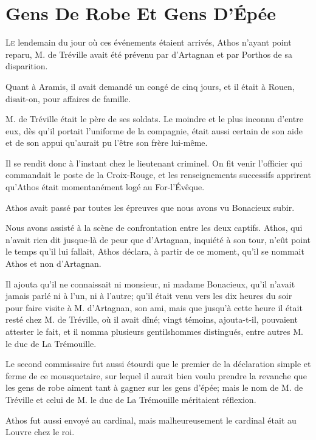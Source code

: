 
\chapter{Gens De Robe Et Gens D'Épée}

\lettrine{L}{e} lendemain du jour où ces événements étaient arrivés, Athos n'ayant point reparu, M. de Tréville avait été prévenu par d'Artagnan et par Porthos de sa disparition. 

\zz
Quant à Aramis, il avait demandé un congé de cinq jours, et il était à Rouen, disait-on, pour affaires de famille. 

M. de Tréville était le père de ses soldats. Le moindre et le plus inconnu d'entre eux, dès qu'il portait l'uniforme de la compagnie, était aussi certain de son aide et de son appui qu'aurait pu l'être son frère lui-même. 

Il se rendit donc à l'instant chez le lieutenant criminel. On fit venir l'officier qui commandait le poste de la Croix-Rouge, et les renseignements successifs apprirent qu'Athos était momentanément logé au For-l'Évêque. 

Athos avait passé par toutes les épreuves que nous avons vu Bonacieux subir. 

Nous avons assisté à la scène de confrontation entre les deux captifs. Athos, qui n'avait rien dit jusque-là de peur que d'Artagnan, inquiété à son tour, n'eût point le temps qu'il lui fallait, Athos déclara, à partir de ce moment, qu'il se nommait Athos et non d'Artagnan. 

Il ajouta qu'il ne connaissait ni monsieur, ni madame Bonacieux, qu'il n'avait jamais parlé ni à l'un, ni à l'autre; qu'il était venu vers les dix heures du soir pour faire visite à M. d'Artagnan, son ami, mais que jusqu'à cette heure il était resté chez M. de Tréville, où il avait dîné; vingt témoins, ajouta-t-il, pouvaient attester le fait, et il nomma plusieurs gentilshommes distingués, entre autres M. le duc de La Trémouille. 

Le second commissaire fut aussi étourdi que le premier de la déclaration simple et ferme de ce mousquetaire, sur lequel il aurait bien voulu prendre la revanche que les gens de robe aiment tant à gagner sur les gens d'épée; mais le nom de M. de Tréville et celui de M. le duc de La Trémouille méritaient réflexion. 

Athos fut aussi envoyé au cardinal, mais malheureusement le cardinal était au Louvre chez le roi. 

